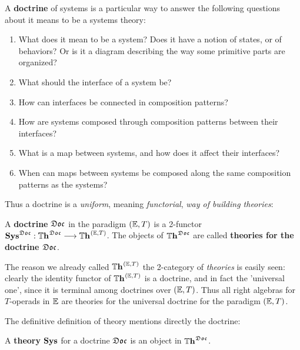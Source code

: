 \begin{informaldefinition}[Doctrine]
	A \textbf{doctrine} of systems is a particular way to answer the following questions about it means to be a systems theory:
	\begin{enumerate}
		\item What does it mean to be a system? Does it have a notion of states, or of behaviors?
		Or is it a diagram describing the way some primitive parts are organized?
		\item What should the interface of a system be?
		\item How can interfaces be connected in composition patterns?
		\item How are systems composed through composition patterns between their interfaces?
		\item What is a map between systems, and how does it affect their interfaces?
		\item When can maps between systems be composed along the same composition patterns as the systems?
	\end{enumerate}
\end{informaldefinition}

Thus a doctrine is a \emph{uniform}, meaning \emph{functorial}, \emph{way of building theories}:

\begin{definition}[Doctrine]
	A \textbf{doctrine} ${\mathfrak{Doc}}$ in the paradigm $\Paradigm$ is a 2-functor
	$\Sys^{\Doc} : \Theories^{\Doc} \longto \Theories^\Paradigm$.
	The objects of $\Theories^{\Doc}$ are called \textbf{theories for the doctrine ${\mathfrak{Doc}}$}.
\end{definition}

\begin{remark}
	The reason we already called $\Theories^\Paradigm$ the 2-category of \emph{theories} is easily seen: clearly the identity functor of $\Theories^\Paradigm$ is a doctrine, and in fact the 'universal one', since it is terminal among doctrines over $\Paradigm$.
	Thus all right algebras for $T$-operads in $\dblcat{E}$ are theories for the universal doctrine for the paradigm $\Paradigm$.

	The definitive definition of theory mentions directly the doctrine:
\end{remark}

\begin{definition}[Theory]
	A \textbf{theory} $\Sys$ for a doctrine ${\mathfrak{Doc}}$ is an object in $\Theories^\Doc$.
\end{definition}

